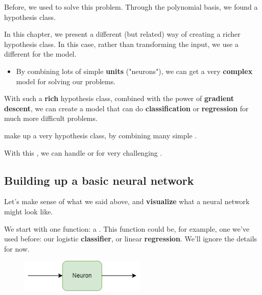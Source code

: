         Before, we used  to solve this problem. Through the polynomial basis, we found a  hypothesis class.

        \phantom{}

        In this chapter, we present a different (but related) way of creating a richer hypothesis class. In this case, rather than transforming the input, we use a different  for the model.

        \begin{itemize}
            \item By combining lots of simple \textbf{units} ("neurons"), we can get a very \textbf{complex} model for solving our problems.
        \end{itemize}
        
        
        With such a \textbf{rich} hypothesis class, combined with the power of \textbf{gradient descent}, we can create a model that can do \textbf{classification} or \textbf{regression} for much more difficult problems.
            \\
            
        \begin{concept}
             make up a very  hypothesis class, by combining many simple .
            
            With this , we can handle  or  for very challenging .
        \end{concept}
    
    \subsection{Building up a basic neural network}
        
        Let's make sense of what we said above, and \textbf{visualize} what a neural network might look like.
        
        We start with one function: a . This function could be, for example, one we've used before: our logistic \textbf{classifier}, or linear \textbf{regression}. We'll ignore the details for now.
       
        \begin{figure}[H]
            \centering
            \includegraphics[width=60mm,scale=0.4]{images/nn_images/neuron.png}
        \end{figure}
       
